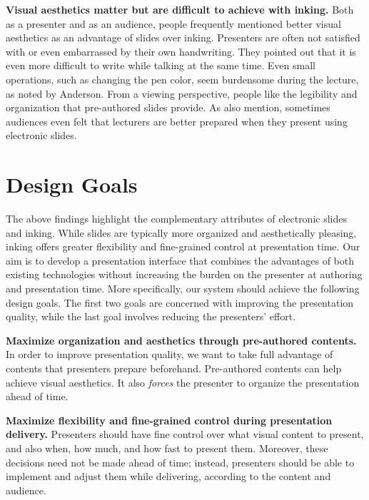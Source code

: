 \textbf{Visual aesthetics matter but are difficult to achieve with inking.} Both as a presenter and as an audience, people frequently mentioned better visual aesthetics as an advantage of slides over inking. Presenters are often not satisfied with or even embarrassed by their own handwriting. They pointed out that it is even more difficult to write while talking at the same time. Even small operations, such as changing the pen color, seem burdensome during the lecture, as noted by Anderson\cite{anderson2004study}. 
%
From a viewing perspective, people like the legibility and organization that pre-authored slides provide. As \cite{frey2002learners} also mention, sometimes audiences even felt that lecturers are better prepared when they present using electronic slides. 

\section{Design Goals}

The above findings highlight the complementary attributes of electronic slides and inking. While slides are typically more organized and aesthetically pleasing, inking offers greater flexibility and fine-grained control at presentation time.
%
Our aim is to develop a presentation interface that combines the advantages of both existing technologies without increasing the burden on the presenter at authoring and presentation time.
%
More specifically, our system should achieve the following design goals. The first two goals are concerned with improving the presentation quality, while the last goal involves reducing the presenters' effort. 

\textbf{Maximize organization and aesthetics through pre-authored contents.} In order to improve presentation quality, we want to take full advantage of contents that presenters prepare beforehand. Pre-authored contents can help achieve visual aesthetics. It also \textit{forces} the presenter to organize the presentation ahead of time. 
 
\textbf{Maximize flexibility and fine-grained control during presentation delivery.} Presenters should have fine control over what visual content to present, and also when, how much, and how fast to present them. Moreover, these decisions need not be made ahead of time; instead, presenters should be able to implement and adjust them while delivering, according to the content and audience. 

